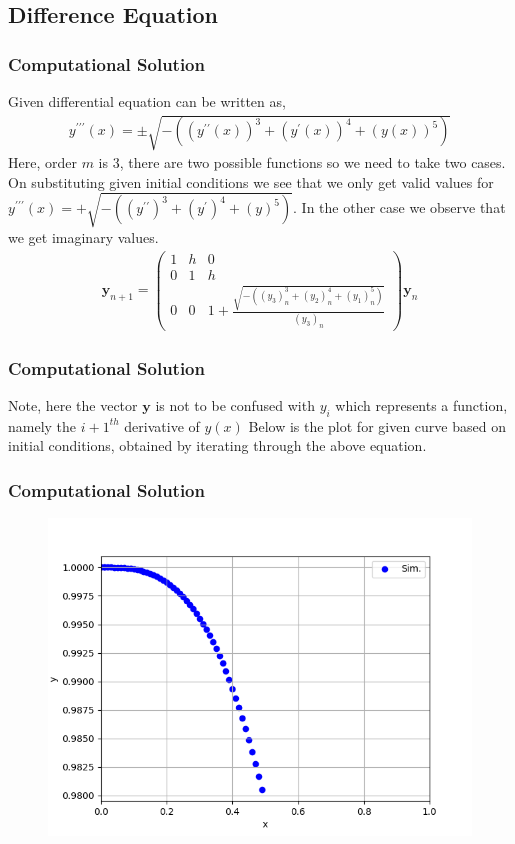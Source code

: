 \documentclass{beamer}
\providecommand{\brak}[1]{\ensuremath{\left(#1\right)}}
\theoremstyle{remark}
\newcommand{\myvec}[1]{\ensuremath{\begin{pmatrix}#1\end{pmatrix}}}
\let\vec\mathbf
\numberwithin{equation}{section}
\begin{document}
		\subsection{Difference Equation}
		\begin{frame}[fragile]
			\frametitle{Computational Solution}
Given differential equation can be written as,
      {\small
\begin{align}
    y^{\prime \prime \prime}\brak{x} = \pm \sqrt{-\brak{\brak{y^{\prime \prime}\brak{x}}^3 + \brak{y^{\prime}\brak{x}}^4 + \brak{y\brak{x}}^5 }}
\end{align}
      }
      Here, order $m$ is 3, there are two possible functions so we need to take two cases. On substituting given initial conditions we see that we only get valid values for {\small$y^{\prime \prime \prime}\brak{x} = + \sqrt{-\brak{\brak{y^{\prime \prime}}^3 + \brak{y^{\prime}}^4 + \brak{y}^5 }}$.} In the other case we observe that we get imaginary values.
      {\small
      \begin{align}
  \vec{y}_{n+1}=\myvec{1 & h & 0 \\ 0 & 1 & h \\ 0 & 0 & 1+\frac{\sqrt{-\brak{\brak{y_3}_n^3 + \brak{y_2}_n^4 + \brak{y_1}_n^5}} }{\brak{y_3}_n}}\vec{y}_{n}
\end{align}
      }
		\end{frame}
		\begin{frame}[fragile]
			\frametitle{Computational Solution}
Note, here the vector $\vec{y}$ is not to be confused with $y_i$ which represents a function, namely the ${i+1}^{th}$ derivative of $y\brak{x}$ Below is the plot for given curve  based on initial conditions, obtained by iterating through the above equation.
		\end{frame}
		\begin{frame}[fragile]
			\frametitle{Computational Solution}
			\begin{figure}[h!]
				\centering
				\includegraphics[width=1\columnwidth]{figs/fig.png}
				\label{stemplot}
			\end{figure}
	\end{frame}
	
\end{document}
